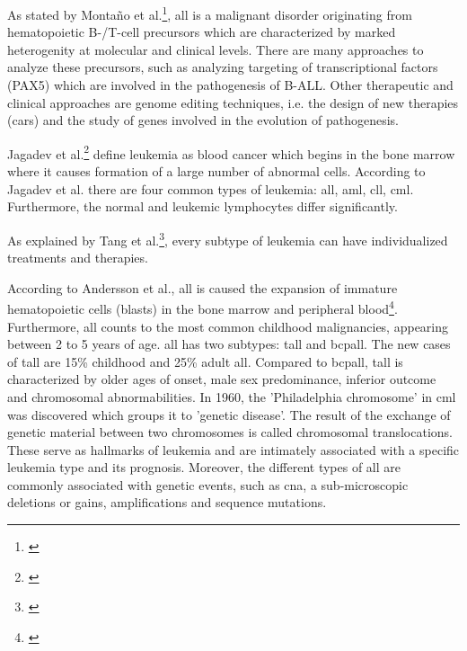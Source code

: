 As stated by Monta\~{n}o et al.\footnote{\autocite{montano_2018}}, \gls{all} is a malignant disorder originating from hematopoietic B-/T-cell precursors which are characterized by marked heterogenity at molecular and clinical levels. There are many approaches to analyze these precursors, such as analyzing targeting of transcriptional factors (PAX5) which are involved in the pathogenesis of B-ALL. Other therapeutic and clinical approaches are genome editing techniques, i.e. the design of new therapies (\gls{car}s) and the study of genes involved in the evolution of pathogenesis.

Jagadev et al.\footnote{\autocite{jagadev}} define leukemia as blood cancer which begins in the bone marrow where it causes formation of a large number of abnormal cells. According to Jagadev et al. there are four common types of leukemia: \gls{all}, \gls{aml}, \gls{cll}, \gls{cml}. Furthermore, the normal and leukemic lymphocytes differ significantly.

As explained by Tang et al.\footnote{\autocite{tang}}, every subtype of leukemia can have individualized treatments and therapies.

According to Andersson et al., \gls{all} is caused the expansion of immature hematopoietic cells (blasts) in the bone marrow and peripheral blood\footnote{\autocite{andersson}}. Furthermore, \gls{all} counts to the most common childhood malignancies, appearing between 2 to 5 years of age. \gls{all} has two subtypes: \gls{tall} and \gls{bcpall}.
The new cases of \gls{tall} are 15\% childhood and 25\% adult \gls{all}. Compared to \gls{bcpall}, \gls{tall} is characterized by older ages of onset, male sex predominance, inferior outcome and chromosomal abnormabilities.
In 1960, the 'Philadelphia chromosome' in \gls{cml} was discovered which groups it to 'genetic disease'.
The result of the exchange of genetic material between two chromosomes is called chromosomal translocations. These serve as hallmarks of leukemia and are intimately associated with a specific leukemia type and its prognosis. Moreover, the different types of \gls{all} are commonly associated with genetic events, such as \gls{cna}, a sub-microscopic deletions or gains,  amplifications and sequence mutations.

